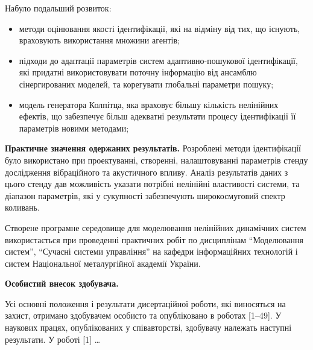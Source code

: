 \documentclass[a4paper,13pt]{atuaref}
\begin{document}
\noindent
Набуло подальший розвиток:
\begin{itemize}

  \item
  методи оцінювання якості ідентифікації,
  які на відміну від тих, що існують,
  враховують використання множини агентів;

  \item
  підходи до адаптації параметрів систем
  адаптивно-пошукової ідентифікації, які придатні використовувати поточну
  інформацію від ансамблю сінергированих моделей, та корегувати глобальні
  параметри пошуку;

  \item
    модель генератора Колпітца, яка враховує
    більшу кількість нелінійних ефектів,
    що забезпечує більш адекватні результати процесу
    ідентифікації її параметрів новими методами;

\end{itemize}


\smallskip
\textbf{Практичне значення одержаних результатів.}
Розроблені методи ідентифікації було використано
при проектуванні, створенні, налаштовуванні параметрів
стенду дослідження вібраційного та акустичного впливу.
Аналіз результатів даних з цього стенду
дав можливість указати потрібні нелінійні властивості системи,
та діапазон параметрів, які у сукупності
забезпечують широкосмуговий спектр коливань.

Створене програмне середовище для моделювання нелінійних динамічних систем
використається при проведенні практичних робіт по дисциплінам
``Моделювання систем'',
``Сучасні системи управління'' на кафедри інформаційних технологій
і систем Національної металургійної академії України.


\smallskip
\textbf{Особистий внесок здобувача.}

Усі основні положення і результати
дисертаційної роботи, які виносяться на захист, отримано здобувачем особисто та
опубліковано в роботах [1--49]. У наукових працях, опублікованих у співавторстві,
здобувачу належать наступні результати. У роботі [1] \ldots
\end{document}
